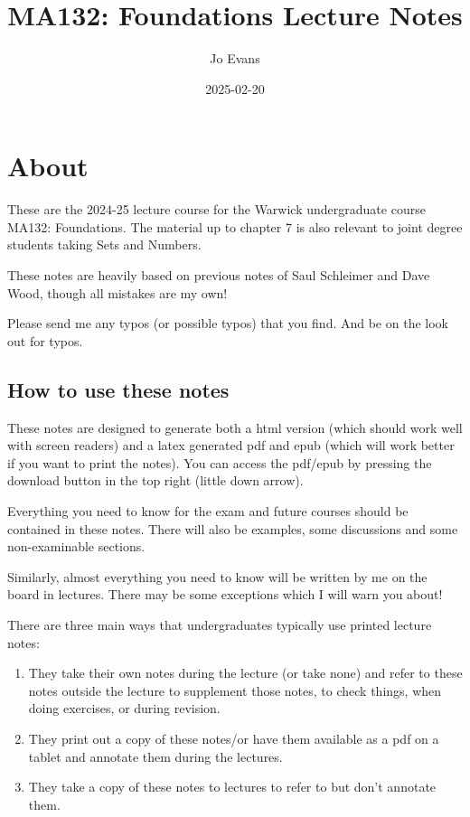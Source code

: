 \documentclass[
]{book}
\title{MA132: Foundations Lecture Notes}
\author{Jo Evans}
\date{2025-02-20}
\theoremstyle{definition}
\theoremstyle{definition}
\theoremstyle{definition}
\theoremstyle{definition}
\theoremstyle{remark}
\begin{document}
\maketitle

{
\setcounter{tocdepth}{1}
\tableofcontents
}
\chapter{About}\label{about}

These are the 2024-25 lecture course for the Warwick undergraduate course MA132: Foundations. The material up to chapter 7 is also relevant to joint degree students taking Sets and Numbers.

These notes are heavily based on previous notes of Saul Schleimer and Dave Wood, though all mistakes are my own!

Please send me any typos (or possible typos) that you find. And be on the look out for typos.

\section{How to use these notes}\label{how-to-use-these-notes}

These notes are designed to generate both a html version (which should work well with screen readers) and a latex generated pdf and epub (which will work better if you want to print the notes). You can access the pdf/epub by pressing the download button in the top right (little down arrow).

Everything you need to know for the exam and future courses should be contained in these notes. There will also be examples, some discussions and some non-examinable sections.

Similarly, almost everything you need to know will be written by me on the board in lectures. There may be some exceptions which I will warn you about!

There are three main ways that undergraduates typically use printed lecture notes:

\begin{enumerate}
\def\labelenumi{\arabic{enumi}.}
\item
  They take their own notes during the lecture (or take none) and refer to these notes outside the lecture to supplement those notes, to check things, when doing exercises, or during revision.
\item
  They print out a copy of these notes/or have them available as a pdf on a tablet and annotate them during the lectures.
\item
  They take a copy of these notes to lectures to refer to but don't annotate them.
\end{enumerate}
\end{document}

